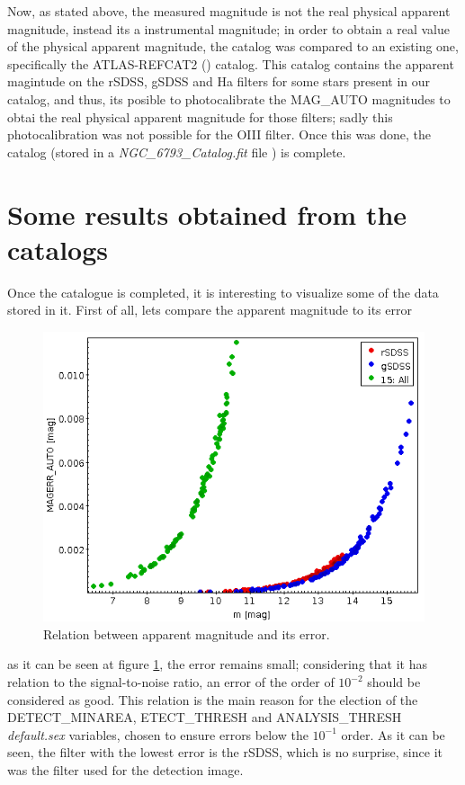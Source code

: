 \documentclass{aa}
\begin{document}
    Now, as stated above, the measured magnitude is not the real physical apparent magnitude, instead its a instrumental magnitude; in order to obtain a real value of the physical apparent magnitude, the catalog was compared to an existing one, specifically the ATLAS-REFCAT2 (\cite{PhotoCalibrate}) catalog. This catalog contains the apparent magintude on the rSDSS, gSDSS and Ha filters for some stars present in our catalog, and thus, its posible to photocalibrate the MAG\_AUTO magnitudes to obtai the real physical apparent magnitude for those filters; sadly this photocalibration was not possible for the OIII filter. Once this was done, the catalog (stored in a \textit{NGC\_6793\_Catalog.fit} file \cite{GitHub}) is complete.
    \section{Some results obtained from the catalogs}\label{sec: Results}
    Once the catalogue is completed, it is interesting to visualize some of the data stored in it. First of all, lets compare the apparent magnitude to its error 
    \begin{figure}[H]
        \centering
        \includegraphics[width=0.8\linewidth]{Images/mag_Err.png}
        \caption{Relation between apparent magnitude and its error.}
        \label{fig: error}
    \end{figure}
    as it can be seen at figure \ref{fig: error}, the error remains small; considering that it has relation to the signal-to-noise ratio, an error of the order of $10^{-2}$ should be considered as good. This relation is the main reason for the election of the DETECT\_MINAREA, ETECT\_THRESH and ANALYSIS\_THRESH \textit{default.sex} variables, chosen to ensure errors below the $10^{-1}$ order. As it can be seen, the filter with the lowest error is the rSDSS, which is no surprise, since it was the filter used for the detection image.
\end{document}
